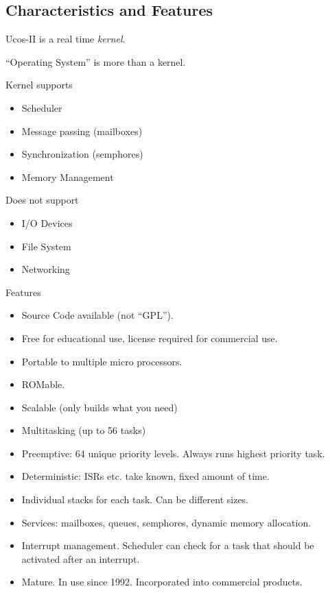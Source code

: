 \subsection{Characteristics and Features}

Ucos-II is a real time {\it kernel}.

``Operating System'' is more than a kernel.

Kernel supports
\begin{itemize}
  \item Scheduler
  \item Message passing (mailboxes)
  \item Synchronization (semphores)
  \item Memory Management
\end{itemize}

Does not support
\begin{itemize}
  \item I/O Devices
  \item File System
  \item Networking
\end{itemize}

Features

\begin{itemize}
  \item Source Code available (not ``GPL'').
  \item Free for educational use, license required
  for commercial use.
  \item Portable to multiple micro processors.
  \item ROMable.
  \item Scalable (only builds what you need)
  \item Multitasking (up to 56 tasks)
  \item Preemptive:  64 unique priority levels.
  Always runs highest priority task.
  \item Deterministic:  ISRs etc. take known,
  fixed amount of time.
  \item Individual stacks for each task. Can
  be different sizes.
  \item Services:  mailboxes, queues, semphores,
  dynamic memory allocation.
  \item Interrupt management.  Scheduler can
  check for a task that should be activated after an
  interrupt.
  \item Mature.  In use since 1992.  Incorporated
  into commercial products.
\end{itemize}

